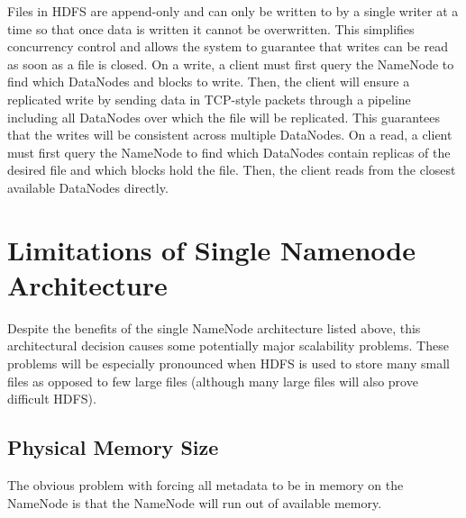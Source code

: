 \documentclass[11pt, a4paper]{article}
\begin{document}
\begin{multicols*}{2}

Files in HDFS are append-only and can only be written to by a single writer at a time so that once data is written it cannot be overwritten. This simplifies concurrency control and allows the system to guarantee that writes can be read as soon as a file is closed. On a write, a client must first query the NameNode to find which DataNodes and blocks to write. Then, the client will ensure a replicated write by sending data in TCP-style packets through a pipeline including all DataNodes over which the file will be replicated. This guarantees that the writes will be consistent across multiple DataNodes. On a read, a client must first query the NameNode to find which DataNodes contain replicas of the desired file and which blocks hold the file. Then, the client reads from the closest available DataNodes directly. 


\section{Limitations of Single Namenode Architecture}

Despite the benefits of the single NameNode architecture listed above, this architectural decision causes some potentially major scalability problems. These problems will be especially pronounced when HDFS is used to store many small files as opposed to few large files (although many large files will also prove difficult HDFS). 

\subsection{Physical Memory Size}

The obvious problem with forcing all metadata to be in memory on the NameNode is that the NameNode will run out of available memory. %


\end{multicols*}
\end{document}
